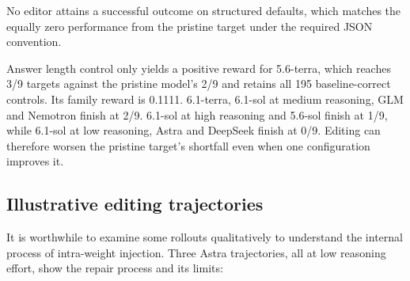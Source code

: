 No editor attains a successful outcome on structured defaults, which matches the equally zero performance from
the pristine target under the required JSON convention.

Answer length control only yields a positive reward for 5.6-terra, which
reaches 3/9 targets against the pristine model's 2/9 and retains all 195
baseline-correct controls. Its family reward is 0.1111. 6.1-terra,
6.1-sol at medium reasoning, GLM and Nemotron finish at 2/9. 6.1-sol at
high reasoning and 5.6-sol finish at 1/9, while 6.1-sol at low reasoning,
Astra and DeepSeek finish at 0/9. Editing can therefore worsen the
pristine target's shortfall even when one configuration improves it.


\subsection{Illustrative editing trajectories}
\label{sec:rollout-illustrations}

It is worthwhile to examine some rollouts qualitatively to understand the internal process of intra-weight injection. Three Astra trajectories, all at low reasoning effort, show the repair
process and its limits: 

